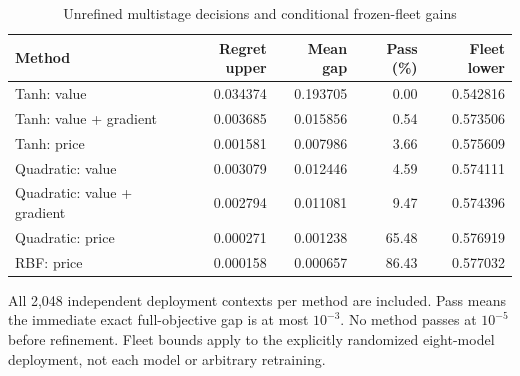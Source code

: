 \begin{table}[p]
\centering
\caption{Unrefined multistage decisions and conditional frozen-fleet gains}\label{tab:r19-quality}
\setlength{\tabcolsep}{4pt}
\begin{tabular}{lrrrr}
\toprule
Method & Regret upper & Mean gap & Pass (\%) & Fleet lower \\
\midrule
Tanh: value & 0.034374 & 0.193705 & 0.00 & 0.542816 \\
Tanh: value + gradient & 0.003685 & 0.015856 & 0.54 & 0.573506 \\
Tanh: price & 0.001581 & 0.007986 & 3.66 & 0.575609 \\
Quadratic: value & 0.003079 & 0.012446 & 4.59 & 0.574111 \\
Quadratic: value + gradient & 0.002794 & 0.011081 & 9.47 & 0.574396 \\
Quadratic: price & 0.000271 & 0.001238 & 65.48 & 0.576919 \\
RBF: price & 0.000158 & 0.000657 & 86.43 & 0.577032 \\
\bottomrule
\end{tabular}

\par\medskip\begin{minipage}{\textwidth}All 2,048 independent deployment contexts per method are included. Pass means the immediate exact full-objective gap is at most $10^{-3}$. No method passes at $10^{-5}$ before refinement. Fleet bounds apply to the explicitly randomized eight-model deployment, not each model or arbitrary retraining.\end{minipage}
\end{table}
